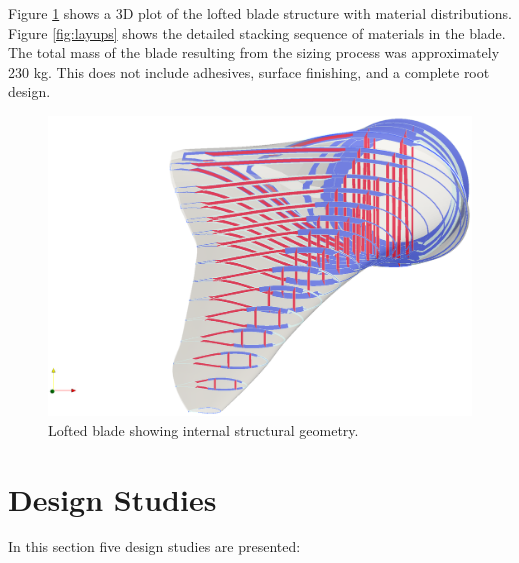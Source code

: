 Figure \ref{fig:loftedstructure_baseline} shows a 3D plot of the lofted blade structure with material distributions.
Figure \ref{fig:layups} shows the detailed stacking sequence of materials in the blade.
The total mass of the blade resulting from the sizing process was approximately 230 kg.
This does not include adhesives, surface finishing, and a complete root design.

\begin{figure}[!ht]
\begin{center}
	\includegraphics[width=1\linewidth]{figures/loftedbladestructure_basic_sizing.eps}
\end{center}
\caption{Lofted blade showing internal structural geometry.}
\label{fig:loftedstructure_baseline}
\end{figure}

\clearpage
\section{Design Studies}
\label{sec:design_studies}

In this section five design studies are presented:


